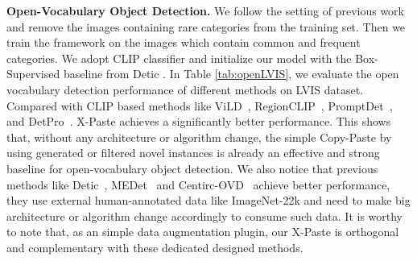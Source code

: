 \documentclass{article}
\begin{document}
\noindent \textbf{Open-Vocabulary Object Detection.}  We follow the setting of previous work and remove the images containing rare categories from the training set. Then we train the framework on the images which contain common and frequent categories. We adopt CLIP classifier\cite{ViLD} and initialize our model with the Box-Supervised baseline from Detic \cite{Detic}. In Table \ref{tab:openLVIS}, we evaluate the open vocabulary detection performance of different methods on LVIS dataset. Compared with CLIP based methods like ViLD~\cite{ViLD}, RegionCLIP~\cite{RegionCLIP}, PromptDet~\cite{PromptDet}, and DetPro~\cite{DetPro}. X-Paste achieves a significantly better performance. This shows that, without any architecture or algorithm change, the simple Copy-Paste by using generated or filtered novel instances is already an effective and strong baseline for open-vocabulary object detection. We also notice that previous methods like Detic~\cite{Detic}, MEDet~\cite{MEDet} and Centirc-OVD~\cite{Centric-OVD} achieve better performance, they use external human-annotated data like ImageNet-22k and need to make big architecture or algorithm change accordingly to consume such data. It is worthy to note that, as an simple data augmentation plugin, our X-Paste is orthogonal and complementary with these dedicated designed methods.

\begin{table}[t]
  \small
  \centering
\caption{Comparison of open-vocabulary detection performance on LVIS,  means they use external supervised data for training.}
\label{tab:openLVIS}
\end{table}
\end{document}
